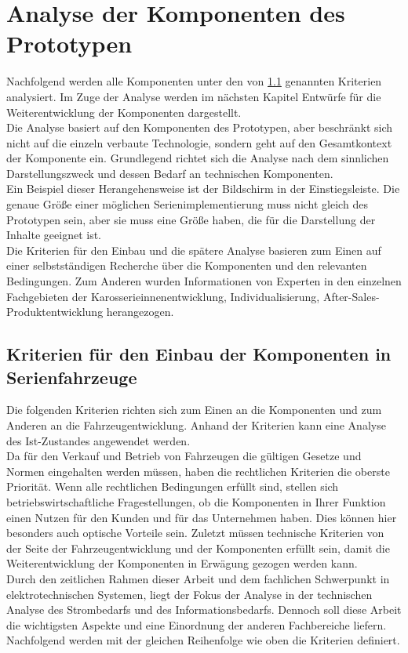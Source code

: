 \chapter{Analyse der Komponenten des Prototypen}
\label{cha:Analyse}
Nachfolgend werden alle Komponenten unter den von \ref{cha:Kriterien} genannten Kriterien analysiert. Im Zuge der Analyse werden im nächsten Kapitel Entwürfe für die Weiterentwicklung der Komponenten dargestellt.\\
Die Analyse basiert auf den Komponenten des Prototypen, aber beschränkt sich nicht auf die einzeln verbaute Technologie, sondern geht auf den Gesamtkontext der Komponente ein. Grundlegend richtet sich die Analyse nach dem sinnlichen Darstellungszweck und dessen Bedarf an technischen Komponenten. \\
Ein Beispiel dieser Herangehensweise ist der Bildschirm in der Einstiegsleiste. Die genaue Größe einer möglichen Serienimplementierung muss nicht gleich des Prototypen sein, aber sie muss eine Größe haben, die für die Darstellung der Inhalte geeignet ist.\\
Die Kriterien für den Einbau und die spätere Analyse basieren zum Einen auf einer selbstständigen Recherche über die Komponenten und den relevanten Bedingungen. Zum Anderen wurden Informationen von Experten in den einzelnen Fachgebieten der Karosserieinnenentwicklung, Individualisierung, After-Sales-Produktentwicklung herangezogen.
\section{Kriterien für den Einbau der Komponenten in Serienfahrzeuge}
\label{cha:Kriterien}
Die folgenden Kriterien richten sich zum Einen an die Komponenten und zum Anderen an die Fahrzeugentwicklung. Anhand der Kriterien kann eine Analyse des Ist-Zustandes angewendet werden.\\
Da für den Verkauf und Betrieb von Fahrzeugen die gültigen Gesetze und Normen eingehalten werden müssen, haben die rechtlichen Kriterien die oberste Priorität. Wenn alle rechtlichen Bedingungen erfüllt sind, stellen sich betriebswirtschaftliche Fragestellungen, ob die Komponenten in Ihrer Funktion einen Nutzen für den Kunden und für das Unternehmen haben. Dies können hier besonders auch optische Vorteile sein. Zuletzt müssen technische Kriterien von der Seite der Fahrzeugentwicklung und der Komponenten erfüllt sein, damit die Weiterentwicklung der Komponenten in Erwägung gezogen werden kann. \\
Durch den zeitlichen Rahmen dieser Arbeit und dem fachlichen Schwerpunkt in elektrotechnischen Systemen, liegt der Fokus der Analyse in der technischen Analyse des Strombedarfs und des Informationsbedarfs. Dennoch soll diese Arbeit die wichtigsten Aspekte und eine Einordnung der anderen Fachbereiche liefern.\\
Nachfolgend werden mit der gleichen Reihenfolge wie oben die Kriterien definiert.
